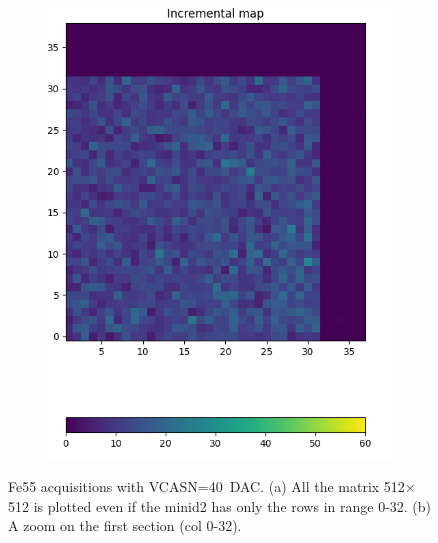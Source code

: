 \begin{figure}
\begin{subfigure}[b]{0.49\textwidth}
            \centering
            \includegraphics[width=\linewidth]{figures/charaterization/ARCADIA/Fe55_6min30s.png}
            \caption{}
            \label{fig:}
        \end{subfigure}
        \caption{Fe55 acquisitions with VCASN=\SI{40}{DAC}. (a) All the matrix 512$\times$512 is plotted even if the minid2 has only the rows in range 0-32. (b) A zoom on the first section (col 0-32). }
        \label{fig:ARCADIA_Fe55}
    \end{figure} 

